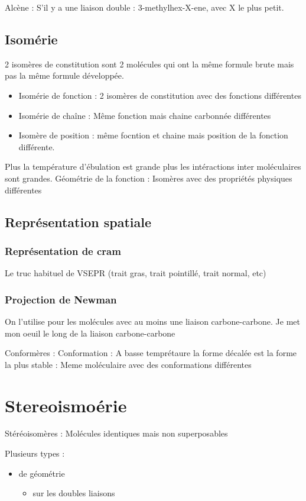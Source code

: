 \documentclass[french]{yLectureNote}
\begin{document}
Alcène : S'il y a une liaison double : 3-methylhex-X-ene, avec X le plus petit.
\subsection{Isomérie}
2 isomères de constitution sont 2 molécules qui ont la m\^eme formule brute mais pas la m\^eme formule développée.
\begin{itemize}
 \item Isomérie de fonction : 2 isomères de constitution avec des fonctions différentes
 \item Isomérie de cha\^ine : M\^eme fonction mais chaine carbonnée différentes
 \item Isomère de position : m\^eme focntion et chaine mais position de la fonction différente.
\end{itemize}
Plus la température d'ébulation est grande plus les intéractions inter moléculaires sont grandes. Géométrie de la fonction : Isomères avec des propriétés physiques différentes
\subsection{Représentation spatiale}
\subsubsection{Représentation de cram}
Le truc habituel de VSEPR (trait gras, trait pointillé, trait normal, etc)
\subsubsection{Projection de Newman}
On l'utilise pour les molécules avec au moins une liaison carbone-carbone. Je met mon oeuil le long de la liaison carbone-carbone

Conformères : Conformation : A basse temprétaure la forme décalée est la forme la plus stable : Meme moléculaire avec des conformations différentes
\section{Stereoismoérie}
Stéréoisomères : Molécules identiques mais non superposables

Plusieurs types :
\begin{itemize}
 \item de géométrie
 \begin{itemize}
  \item sur les doubles liaisons
 \end{itemize}

\end{itemize}
\end{document}
